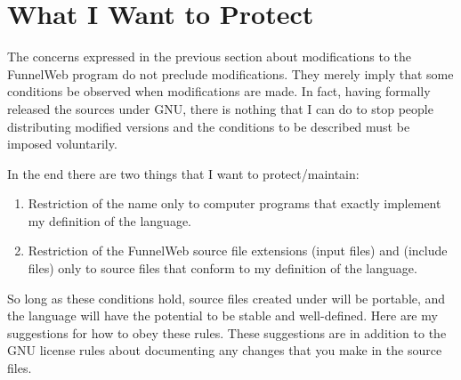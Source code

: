 \section{What I Want to Protect}

The concerns expressed in the previous section about modifications to the
FunnelWeb program do not preclude modifications. They merely imply that
some conditions be observed when modifications are made.
In fact,
having formally released the sources under GNU, there is nothing that
I can do to stop people distributing modified versions and the conditions
to be described must be imposed voluntarily.

In the end there are two things that I want to protect/maintain:

\begin{enumerate}

\item Restriction of the name  only to computer programs
that exactly implement my  definition of the language.

\item Restriction of the FunnelWeb source file extensions 
(input files) and  (include files) only
to source files that conform to my  definition of the
language.

\end{enumerate}

So long as these conditions hold, source files created under 
will be portable, and the language will have the potential to
be stable and well-defined. Here are my suggestions for how to
obey these rules. These suggestions are in addition to the GNU license
rules about documenting any changes that you make in the source files.



